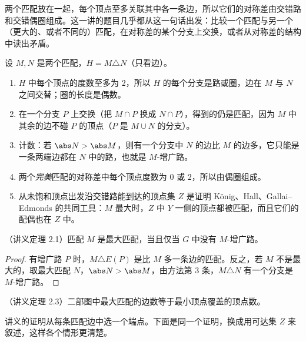 \label{lec:augmenting-paths}

两个匹配放在一起，每个顶点至多关联其中各一条边，所以它们的对称差由交错路和交错偶圈组成。这一讲的题目几乎都从这一句话出发：比较一个匹配与另一个（更大的、或者不同的）匹配，在对称差的某个分支上交换，或者从对称差的结构中读出矛盾。


设 $M,N$ 是两个匹配，$H=M\triangle N$（只看边）。
\begin{enumerate}
\item $H$ 中每个顶点的度数至多为 $2$，所以 $H$ 的每个分支是路或圈，边在 $M$ 与 $N$ 之间交替；圈的长度是偶数。
\item 在一个分支 $P$ 上交换（把 $M\cap P$ 换成 $N\cap P$），得到的仍是匹配，因为 $M$ 中其余的边不碰 $P$ 的顶点（$P$ 是 $M\cup N$ 的分支）。
\item 计数：若 $\abs N>\abs M$，则有一个分支中 $N$ 的边比 $M$ 的边多，它只能是一条两端边都在 $N$ 中的路，也就是 $M$-增广路。
\item 两个\emph{完美}匹配的对称差中每个顶点度数为 $0$ 或 $2$，所以由偶圈组成。
\item 从未饱和顶点出发沿交错路能到达的顶点集 $Z$ 是证明 König、Hall、Gallai--Edmonds 的共同工具：$M$ 最大时，$Z$ 中 $Y$ 一侧的顶点都被匹配，而且它们的配偶也在 $Z$ 中。
\end{enumerate}

\begin{theorem}[Berge]\label{thm:augmenting-paths:berge}
（讲义定理 2.1）匹配 $M$ 是最大匹配，当且仅当 $G$ 中没有 $M$-增广路。
\end{theorem}
\begin{proof}
有增广路 $P$ 时，$M\triangle E(P)$ 是比 $M$ 多一条边的匹配。反之，若 $M$ 不是最大的，取最大匹配 $N$，$\abs N>\abs M$，由方法第 3 条，$M\triangle N$ 有一个分支是 $M$-增广路。
\end{proof}

\begin{theorem}[König]\label{thm:augmenting-paths:konig}
（讲义定理 2.3）二部图中最大匹配的边数等于最小顶点覆盖的顶点数。
\end{theorem}

讲义的证明从每条匹配边中选一个端点。下面是同一个证明，换成用可达集 $Z$ 来叙述，这样各个情形更清楚。

